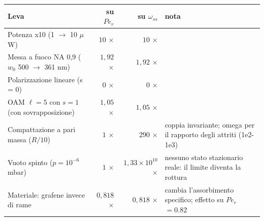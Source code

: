 \begin{tabular}{p{6.2cm}rrp{5.2cm}}
\hline
Leva & su $Pe_r$ & su $\omega_{ss}$ & nota \\
\hline
Potenza x10 (1 $\to$ 10 $\mu$W) & $10$ $\times$ & $10$ $\times$ &  \\
Messa a fuoco NA 0,9 ($w_0$ 500 $\to$ 361 nm) & $1{,}92$ $\times$ & $1{,}92$ $\times$ &  \\
Polarizzazione lineare (s = 0) & $0$ $\times$ & $0$ $\times$ &  \\
OAM $\ell = 5$ con $s = 1$ (con sovrapposizione) & $1{,}05$ $\times$ & $1{,}05$ $\times$ &  \\
Compattazione a pari massa ($R/10$) & $1$ $\times$ & $290$ $\times$ & coppia invariante; omega per il rapporto degli attriti (1e2-1e3) \\
Vuoto spinto ($p = 10^{-6}$ mbar) & $1$ $\times$ & $1{,}33\times10^{10}$ $\times$ & nessuno stato stazionario reale: il limite diventa la rottura \\
Materiale: grafene invece di rame & $0{,}818$ $\times$ & $0{,}818$ $\times$ & cambia l’assorbimento specifico; effetto su $Pe_r$ $= 0.82$ \\
\hline
\end{tabular}
